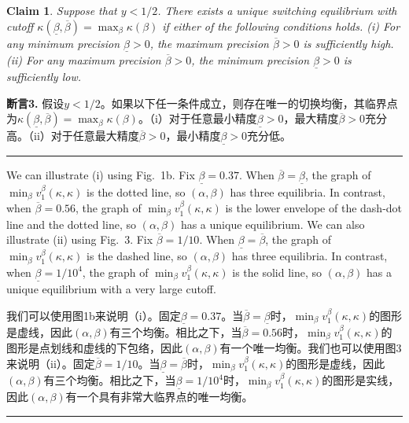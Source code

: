 \documentclass[12pt,a4paper]{article}
\newenvironment{original}
  {\par\medskip\noindent\color{black}\ignorespaces}
  {\par\medskip}
\newenvironment{translation}
  {\par\noindent\color{darkblue}\ignorespaces}
  {\par\medskip\noindent\hrule\par\medskip}
\newtheorem{claim}[theorem]{Claim}
\theoremstyle{definition}
\theoremstyle{remark}
\begin{document}
\begin{claim}
Suppose that $y < 1/2$. There exists a unique switching equilibrium with cutoff $\kappa(\underline{\beta}, \overline{\beta}) = \max_{\beta} \kappa(\beta)$ if either of the following conditions holds. (i) For any minimum precision $\underline{\beta} > 0$, the maximum precision $\overline{\beta} > 0$ is sufficiently high. (ii) For any maximum precision $\overline{\beta} > 0$, the minimum precision $\underline{\beta} > 0$ is sufficiently low.
\end{claim}
\begin{translation}
\color{darkblue}\textbf{断言3.} 假设$y < 1/2$。如果以下任一条件成立，则存在唯一的切换均衡，其临界点为$\kappa(\underline{\beta}, \overline{\beta}) = \max_{\beta} \kappa(\beta)$。（i）对于任意最小精度$\underline{\beta} > 0$，最大精度$\overline{\beta} > 0$充分高。（ii）对于任意最大精度$\overline{\beta} > 0$，最小精度$\underline{\beta} > 0$充分低。
\end{translation}

\begin{original}
We can illustrate (i) using Fig.\ 1b. Fix $\underline{\beta} = 0.37$. When $\overline{\beta} = \underline{\beta}$, the graph of $\min_{\beta} v_1^\beta(\kappa, \kappa)$ is the dotted line, so $(\alpha, \beta)$ has three equilibria. In contrast, when $\overline{\beta} = 0.56$, the graph of $\min_{\beta} v_1^\beta(\kappa, \kappa)$ is the lower envelope of the dash-dot line and the dotted line, so $(\alpha, \beta)$ has a unique equilibrium. We can also illustrate (ii) using Fig.\ 3. Fix $\overline{\beta} = 1/10$. When $\underline{\beta} = \overline{\beta}$, the graph of $\min_{\beta} v_1^\beta(\kappa, \kappa)$ is the dashed line, so $(\alpha, \beta)$ has three equilibria. In contrast, when $\underline{\beta} = 1/10^4$, the graph of $\min_{\beta} v_1^\beta(\kappa, \kappa)$ is the solid line, so $(\alpha, \beta)$ has a unique equilibrium with a very large cutoff.
\end{original}
\begin{translation}
我们可以使用图1b来说明（i）。固定$\underline{\beta} = 0.37$。当$\overline{\beta} = \underline{\beta}$时，$\min_{\beta} v_1^\beta(\kappa, \kappa)$的图形是虚线，因此$(\alpha, \beta)$有三个均衡。相比之下，当$\overline{\beta} = 0.56$时，$\min_{\beta} v_1^\beta(\kappa, \kappa)$的图形是点划线和虚线的下包络，因此$(\alpha, \beta)$有一个唯一均衡。我们也可以使用图3来说明（ii）。固定$\overline{\beta} = 1/10$。当$\underline{\beta} = \overline{\beta}$时，$\min_{\beta} v_1^\beta(\kappa, \kappa)$的图形是虚线，因此$(\alpha, \beta)$有三个均衡。相比之下，当$\underline{\beta} = 1/10^4$时，$\min_{\beta} v_1^\beta(\kappa, \kappa)$的图形是实线，因此$(\alpha, \beta)$有一个具有非常大临界点的唯一均衡。
\end{translation}
\end{document}
